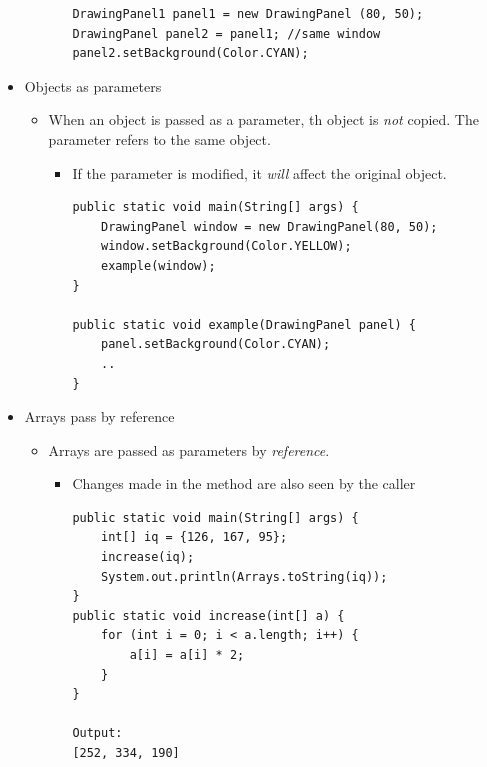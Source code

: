 \documentclass[a4paper]{article}
\begin{document}
\begin{itemize}
\begin{itemize}
\begin{itemize}
\begin{lstlisting}
DrawingPanel1 panel1 = new DrawingPanel (80, 50);
DrawingPanel panel2 = panel1; //same window
panel2.setBackground(Color.CYAN);
					\end{lstlisting}
			\end{itemize}
	\end{itemize}
	\item Objects as parameters
		\begin{itemize}
			\item When an object is passed as a parameter, th object is \textit{not} copied. The parameter refers to the same object.
				\begin{itemize}
					\item If the parameter is modified, it \textit{will} affect the original object.
					\begin{lstlisting}
public static void main(String[] args) {
	DrawingPanel window = new DrawingPanel(80, 50);
	window.setBackground(Color.YELLOW);
	example(window);
}

public static void example(DrawingPanel panel) {
	panel.setBackground(Color.CYAN);
	..
}
					\end{lstlisting}
				\end{itemize}
		\end{itemize}
	\item Arrays pass by reference
		\begin{itemize}
			\item Arrays are passed as parameters by \textit{reference}.
				\begin{itemize}
					\item Changes made in the method are also seen by the caller
						\begin{lstlisting}
public static void main(String[] args) {
	int[] iq = {126, 167, 95};
	increase(iq);
	System.out.println(Arrays.toString(iq));
}
public static void increase(int[] a) {
	for (int i = 0; i < a.length; i++) {
		a[i] = a[i] * 2;
	}
}

Output:
[252, 334, 190]
						\end{lstlisting}
						 

\end{itemize}
\end{itemize}
\end{itemize}
\end{document}

